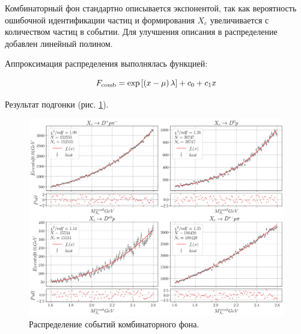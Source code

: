Комбинаторный фон стандартно описывается экспонентой, так как вероятность ошибочной идентификации частиц и формирования $X_c$ увеличивается с количеством частиц в событии. Для улучшения описания в распределение добавлен линейный полином.

Аппроксимация распределения выполнялась функцией:

\begin{equation}
    F_{\text{comb}} = \exp\left[ \left( x - \mu \right)\lambda \right] + c_0 + c_1 x
\end{equation}

Результат подгонки (рис. \ref{MC_comb_fit}).

\begin{figure}[H]
    \centering
    \includegraphics[width=1\linewidth]{img/MC_comb_fit.png}
    \caption{Распределение событий комбинаторного фона.}
    \label{MC_comb_fit}
\end{figure}
